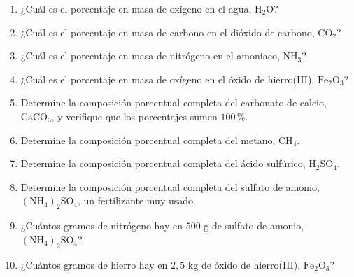 \documentclass[12pt, letterpaper]{article}
\newcommand{\pc}{\text{\%}}
\begin{document}
\begin{enumerate}[leftmargin=*, start=15]

  \item \medio{}\hspace{0.55em}¿Cuál es el porcentaje en masa de oxígeno en el agua, $\text{H}_2\text{O}$?

  \item \medio{}\hspace{0.55em}¿Cuál es el porcentaje en masa de carbono en el dióxido de carbono, $\text{CO}_2$?

  \item \medio{}\hspace{0.55em}¿Cuál es el porcentaje en masa de nitrógeno en el amoniaco, $\text{NH}_3$?

  \item \medio{}\hspace{0.55em}¿Cuál es el porcentaje en masa de oxígeno en el óxido de hierro(III), $\text{Fe}_2\text{O}_3$?

  \item \dificil{}\hspace{0.55em}Determine la composición porcentual completa del carbonato de calcio, $\text{CaCO}_3$, y verifique que los porcentajes sumen $100\,\pc$.

  \item \dificil{}\hspace{0.55em}Determine la composición porcentual completa del metano, $\text{CH}_4$.

  \item \dificil{}\hspace{0.55em}Determine la composición porcentual completa del ácido sulfúrico, $\text{H}_2\text{SO}_4$.

  \item \dificil{}\hspace{0.55em}Determine la composición porcentual completa del sulfato de amonio, $(\text{NH}_4)_2\text{SO}_4$, un fertilizante muy usado.

  \item \dificil{}\hspace{0.55em}¿Cuántos gramos de nitrógeno hay en $500$ g de sulfato de amonio, $(\text{NH}_4)_2\text{SO}_4$?

  \item \dificil{}\hspace{0.55em}¿Cuántos gramos de hierro hay en $2{,}5$ kg de óxido de hierro(III), $\text{Fe}_2\text{O}_3$?


\end{enumerate}
\end{document}
